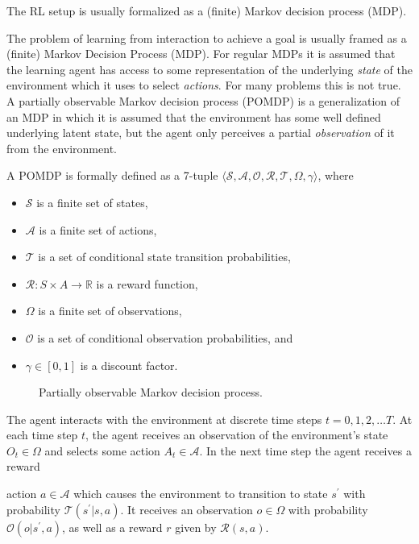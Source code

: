 
The RL setup is usually formalized as a (finite) Markov decision process (MDP).

The problem of learning from interaction to achieve a goal is usually framed as a (finite) Markov Decision Process (MDP).
For regular MDPs it is assumed that the learning agent has access to some representation of the underlying \textit{state} of the environment which it uses to select \textit{actions}.
For many problems this is not true.
A partially observable Markov decision process (POMDP) is a generalization of an MDP in which it is assumed that the environment has some well defined underlying latent state, but the agent only perceives a partial \textit{observation} of it from the environment. 

A POMDP is formally defined as a 7-tuple \(\langle \mathcal{S}, \mathcal{A}, \mathcal{O}, \mathcal{R}, \mathcal{T}, \Omega, \gamma \rangle\), where

\begin{itemize}
    \item \(\mathcal{S}\) is a finite set of states,
    \item \(\mathcal{A}\) is a finite set of actions,
    \item \(\mathcal{T}\) is a set of conditional state transition probabilities,
    \item \(\mathcal{R} : S \times A \rightarrow \mathbb{R}\) is a reward function,
    \item \(\Omega\) is a finite set of observations,
    \item \(\mathcal{O}\) is a set of conditional observation probabilities, and
    \item \(\gamma \in [0, 1]\) is a discount factor.
\end{itemize}

\begin{figure}
    \centering
    
    \label{fig:pomdp}
    \caption{Partially observable Markov decision process.}
\end{figure}

The agent interacts with the environment at discrete time steps \(t = 0, 1, 2, \dots T\). At each time step \(t\), the agent receives an observation of the environment's state \(O_t \in \Omega\) and selects some action \(A_t \in \mathcal{A}\).
In the next time step the agent receives a reward

action \(a \in \mathcal{A}\) which causes the environment to transition to state \(s^\prime\) with probability \(\mathcal{T}(s^\prime | s, a)\).
It receives an observation \(o \in \Omega\) with probability \(\mathcal{O}(o | s^\prime, a)\), as well as a reward \(r\) given by \(\mathcal{R}(s, a)\).

